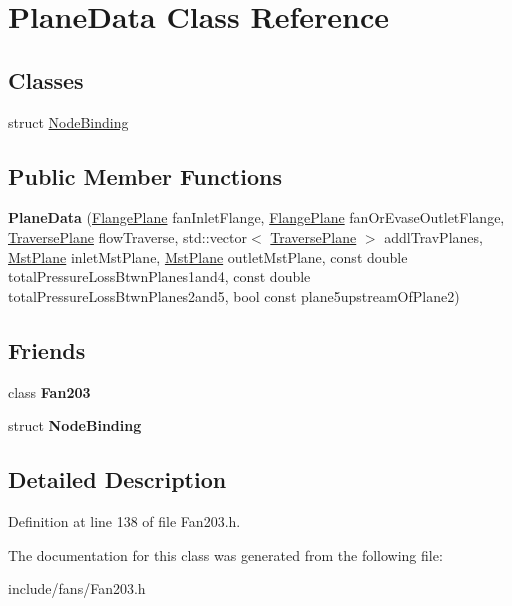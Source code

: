 \hypertarget{class_plane_data}{}\section{Plane\+Data Class Reference}
\label{class_plane_data}
\subsection*{Classes}
\begin{DoxyCompactItemize}
\item 
struct \hyperlink{struct_plane_data_1_1_node_binding}{Node\+Binding}
\end{DoxyCompactItemize}
\subsection*{Public Member Functions}
\begin{DoxyCompactItemize}
\item 
\mbox{\label{class_plane_data_a1ad5393fae6978e34f15d315b03f5525}} 
{\bfseries Plane\+Data} (\hyperlink{class_flange_plane}{Flange\+Plane} fan\+Inlet\+Flange, \hyperlink{class_flange_plane}{Flange\+Plane} fan\+Or\+Evase\+Outlet\+Flange, \hyperlink{class_traverse_plane}{Traverse\+Plane} flow\+Traverse, std\+::vector$<$ \hyperlink{class_traverse_plane}{Traverse\+Plane} $>$ addl\+Trav\+Planes, \hyperlink{class_mst_plane}{Mst\+Plane} inlet\+Mst\+Plane, \hyperlink{class_mst_plane}{Mst\+Plane} outlet\+Mst\+Plane, const double total\+Pressure\+Loss\+Btwn\+Planes1and4, const double total\+Pressure\+Loss\+Btwn\+Planes2and5, bool const plane5upstream\+Of\+Plane2)
\end{DoxyCompactItemize}
\subsection*{Friends}
\begin{DoxyCompactItemize}
\item 
\mbox{\label{class_plane_data_ace899f7afbdc2350f3651b93b809f2fd}} 
class {\bfseries Fan203}
\item 
\mbox{\label{class_plane_data_aa21ca34d24fc6e4a5277a28ca3a8e1f9}} 
struct {\bfseries Node\+Binding}
\end{DoxyCompactItemize}


\subsection{Detailed Description}


Definition at line 138 of file Fan203.\+h.



The documentation for this class was generated from the following file\+:\begin{DoxyCompactItemize}
\item 
include/fans/Fan203.\+h\end{DoxyCompactItemize}
